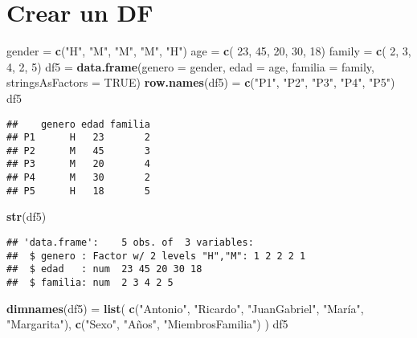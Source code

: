 \documentclass[
]{article}
\newenvironment{Shaded}{\begin{snugshade}}{\end{snugshade}}
\newcommand{\DataTypeTok}[1]{\textcolor[rgb]{0.13,0.29,0.53}{#1}}
\newcommand{\DecValTok}[1]{\textcolor[rgb]{0.00,0.00,0.81}{#1}}
\newcommand{\KeywordTok}[1]{\textcolor[rgb]{0.13,0.29,0.53}{\textbf{#1}}}
\newcommand{\NormalTok}[1]{#1}
\newcommand{\OtherTok}[1]{\textcolor[rgb]{0.56,0.35,0.01}{#1}}
\newcommand{\StringTok}[1]{\textcolor[rgb]{0.31,0.60,0.02}{#1}}
\begin{document}
\hypertarget{crear-un-df}{%
\section{Crear un DF}\label{crear-un-df}}

\begin{Shaded}
\begin{Highlighting}[]
\NormalTok{gender =}\StringTok{ }\KeywordTok{c}\NormalTok{(}\StringTok{"H"}\NormalTok{, }\StringTok{"M"}\NormalTok{, }\StringTok{"M"}\NormalTok{, }\StringTok{"M"}\NormalTok{, }\StringTok{"H"}\NormalTok{)}
\NormalTok{age =}\StringTok{    }\KeywordTok{c}\NormalTok{( }\DecValTok{23}\NormalTok{,  }\DecValTok{45}\NormalTok{,  }\DecValTok{20}\NormalTok{,  }\DecValTok{30}\NormalTok{,  }\DecValTok{18}\NormalTok{)}
\NormalTok{family =}\StringTok{ }\KeywordTok{c}\NormalTok{(  }\DecValTok{2}\NormalTok{,   }\DecValTok{3}\NormalTok{,   }\DecValTok{4}\NormalTok{,   }\DecValTok{2}\NormalTok{,   }\DecValTok{5}\NormalTok{)}
\NormalTok{df5 =}\StringTok{ }\KeywordTok{data.frame}\NormalTok{(}\DataTypeTok{genero =}\NormalTok{ gender, }\DataTypeTok{edad =}\NormalTok{ age, }\DataTypeTok{familia =}\NormalTok{ family, }\DataTypeTok{stringsAsFactors =} \OtherTok{TRUE}\NormalTok{)}
\KeywordTok{row.names}\NormalTok{(df5) =}\StringTok{ }\KeywordTok{c}\NormalTok{(}\StringTok{"P1"}\NormalTok{, }\StringTok{"P2"}\NormalTok{, }\StringTok{"P3"}\NormalTok{, }\StringTok{"P4"}\NormalTok{, }\StringTok{"P5"}\NormalTok{)}
\NormalTok{df5}
\end{Highlighting}
\end{Shaded}

\begin{verbatim}
##    genero edad familia
## P1      H   23       2
## P2      M   45       3
## P3      M   20       4
## P4      M   30       2
## P5      H   18       5
\end{verbatim}

\begin{Shaded}
\begin{Highlighting}[]
\KeywordTok{str}\NormalTok{(df5)}
\end{Highlighting}
\end{Shaded}

\begin{verbatim}
## 'data.frame':    5 obs. of  3 variables:
##  $ genero : Factor w/ 2 levels "H","M": 1 2 2 2 1
##  $ edad   : num  23 45 20 30 18
##  $ familia: num  2 3 4 2 5
\end{verbatim}

\begin{Shaded}
\begin{Highlighting}[]
\KeywordTok{dimnames}\NormalTok{(df5) =}\StringTok{ }\KeywordTok{list}\NormalTok{(}
  \KeywordTok{c}\NormalTok{(}\StringTok{"Antonio"}\NormalTok{, }\StringTok{"Ricardo"}\NormalTok{, }\StringTok{"JuanGabriel"}\NormalTok{, }\StringTok{"María"}\NormalTok{, }\StringTok{"Margarita"}\NormalTok{),}
  \KeywordTok{c}\NormalTok{(}\StringTok{"Sexo"}\NormalTok{, }\StringTok{"Años"}\NormalTok{, }\StringTok{"MiembrosFamilia"}\NormalTok{)}
\NormalTok{)}
\NormalTok{df5}
\end{Highlighting}
\end{Shaded}
\end{document}

